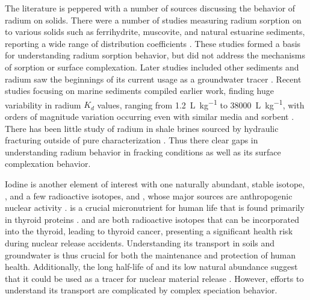 \documentclass[twoside,12pt,titlepage]{article}
\newcommand{\isotope}[2]{\ch{^{#1}#2}}
\begin{document}
\par The literature is peppered with a number of sources discussing the behavior of radium on solids. There were a number of studies measuring radium sorption on to various solids such as ferrihydrite, muscovite, and natural estuarine sediments, reporting a wide range of distribution coefficients \cite{Ames1983a,Ames1983b,Benes1984}. These studies formed a basis for understanding radium sorption behavior, but did not address the mechanisms of sorption or surface complexation. Later studies included other sediments \cite{Tachi2001} and radium saw the beginnings of its current usage as a groundwater tracer \cite{Moore1996}. Recent studies focusing on marine sediments compiled earlier work, finding huge variability in radium $K_d$ values, ranging from \SI{1.2}{\liter\per\kilo\gram} to \SI{38000}{\liter\per\kilo\gram}, with orders of magnitude variation occurring even with similar media and sorbent \cite{Beck2013}. There has been little study of radium in shale brines sourced by hydraulic fracturing outside of pure characterization \cite{Barbot2013,Rowan2011}. Thus there clear gaps in understanding radium behavior in fracking conditions as well as its surface complexation behavior.
\par Iodine is another element of interest with one naturally abundant, stable isotope, \isotope{127}{I}, and a few radioactive isotopes, \isotope{129}{I} and \isotope{131}{I}, whose major sources are anthropogenic nuclear activity \cite{He2013,Landis2012}. \isotope{127}{I} is a crucial micronutrient for human life that is found primarily in thyroid proteins \cite{Hu2009}. \isotope{129}{I} and \isotope{131}{I} are both radioactive isotopes that can be incorporated into the thyroid, leading to thyroid cancer, presenting a significant health risk during nuclear release accidents. Understanding its transport in soils and groundwater is thus crucial for both the maintenance and protection of human health. Additionally, the long half-life of \isotope{129}{I} and its low natural abundance suggest that it could be used as a tracer for nuclear material release \cite{He2013}. However, efforts to understand its transport are complicated by complex speciation behavior.
\end{document}
